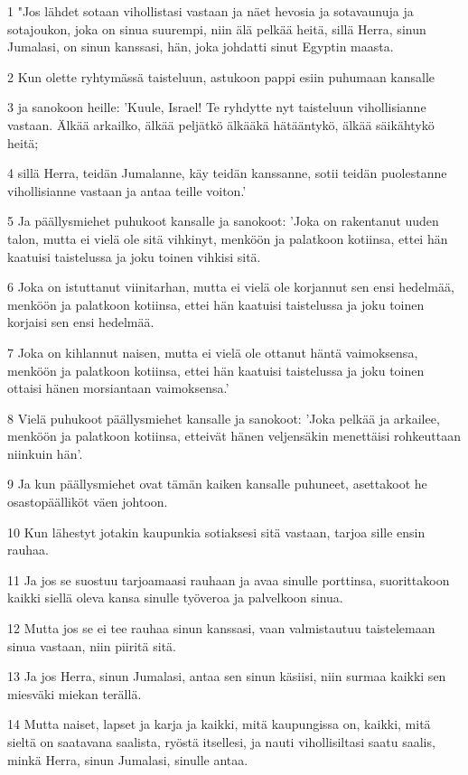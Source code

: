 \par 1 "Jos lähdet sotaan vihollistasi vastaan ja näet hevosia ja sotavaunuja ja sotajoukon, joka on sinua suurempi, niin älä pelkää heitä, sillä Herra, sinun Jumalasi, on sinun kanssasi, hän, joka johdatti sinut Egyptin maasta.
\par 2 Kun olette ryhtymässä taisteluun, astukoon pappi esiin puhumaan kansalle
\par 3 ja sanokoon heille: 'Kuule, Israel! Te ryhdytte nyt taisteluun vihollisianne vastaan. Älkää arkailko, älkää peljätkö älkääkä hätääntykö, älkää säikähtykö heitä;
\par 4 sillä Herra, teidän Jumalanne, käy teidän kanssanne, sotii teidän puolestanne vihollisianne vastaan ja antaa teille voiton.'
\par 5 Ja päällysmiehet puhukoot kansalle ja sanokoot: 'Joka on rakentanut uuden talon, mutta ei vielä ole sitä vihkinyt, menköön ja palatkoon kotiinsa, ettei hän kaatuisi taistelussa ja joku toinen vihkisi sitä.
\par 6 Joka on istuttanut viinitarhan, mutta ei vielä ole korjannut sen ensi hedelmää, menköön ja palatkoon kotiinsa, ettei hän kaatuisi taistelussa ja joku toinen korjaisi sen ensi hedelmää.
\par 7 Joka on kihlannut naisen, mutta ei vielä ole ottanut häntä vaimoksensa, menköön ja palatkoon kotiinsa, ettei hän kaatuisi taistelussa ja joku toinen ottaisi hänen morsiantaan vaimoksensa.'
\par 8 Vielä puhukoot päällysmiehet kansalle ja sanokoot: 'Joka pelkää ja arkailee, menköön ja palatkoon kotiinsa, etteivät hänen veljensäkin menettäisi rohkeuttaan niinkuin hän'.
\par 9 Ja kun päällysmiehet ovat tämän kaiken kansalle puhuneet, asettakoot he osastopäälliköt väen johtoon.
\par 10 Kun lähestyt jotakin kaupunkia sotiaksesi sitä vastaan, tarjoa sille ensin rauhaa.
\par 11 Ja jos se suostuu tarjoamaasi rauhaan ja avaa sinulle porttinsa, suorittakoon kaikki siellä oleva kansa sinulle työveroa ja palvelkoon sinua.
\par 12 Mutta jos se ei tee rauhaa sinun kanssasi, vaan valmistautuu taistelemaan sinua vastaan, niin piiritä sitä.
\par 13 Ja jos Herra, sinun Jumalasi, antaa sen sinun käsiisi, niin surmaa kaikki sen miesväki miekan terällä.
\par 14 Mutta naiset, lapset ja karja ja kaikki, mitä kaupungissa on, kaikki, mitä sieltä on saatavana saalista, ryöstä itsellesi, ja nauti vihollisiltasi saatu saalis, minkä Herra, sinun Jumalasi, sinulle antaa.
